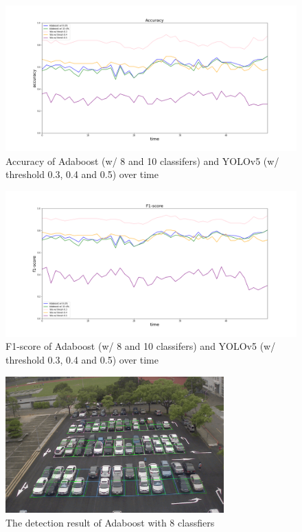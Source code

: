 \documentclass{article}[12pt]
\begin{document}
\begin{figure}[H]
    \centering
    \includegraphics[width=\textwidth]{figure/Accuracy.png}
    \caption{Accuracy of Adaboost (w/ 8 and 10 classifers)
    and YOLOv5 (w/ threshold 0.3, 0.4 and 0.5) over time}
    \label{fig:acc}
\end{figure}


\begin{figure}[H]
    \centering
    \includegraphics[width=\textwidth]{figure/F1-score.png}
    \caption{F1-score of Adaboost (w/ 8 and 10 classifers)
    and YOLOv5 (w/ threshold 0.3, 0.4 and 0.5) over time}
    \label{fig:F1}
\end{figure}

\begin{figure}[H]
    \centering
    \includegraphics[width=0.75\textwidth]{figure/Adaboost_first_frame_8.png}
    \caption{The detection result of Adaboost with 8 classfiers}
\end{figure}
\end{document}
